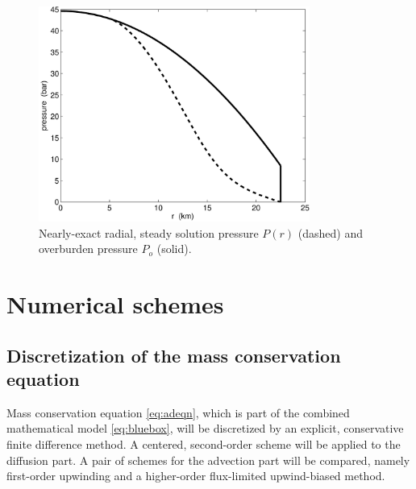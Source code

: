 \documentclass[11pt,final]{amsart}
\begin{document}
\begin{figure}[ht]
\includegraphics[width=3.5in,keepaspectratio=true]{exact-P-plot}
\caption{Nearly-exact radial, steady solution pressure $P(r)$ (dashed) and overburden pressure $P_o$ (solid).}
\label{fig:Pexact}
\end{figure}


\section{Numerical schemes}  \label{sec:num}

\subsection*{Discretization of the mass conservation equation}  Mass conservation equation \eqref{eq:adeqn}, which is part of the combined mathematical model \eqref{eq:bluebox}, will be discretized by an explicit, conservative finite difference method.   A centered, second-order scheme will be applied to the diffusion part.  A pair of schemes for the advection part will be compared, namely first-order upwinding and a higher-order flux-limited upwind-biased method.
\end{document}
